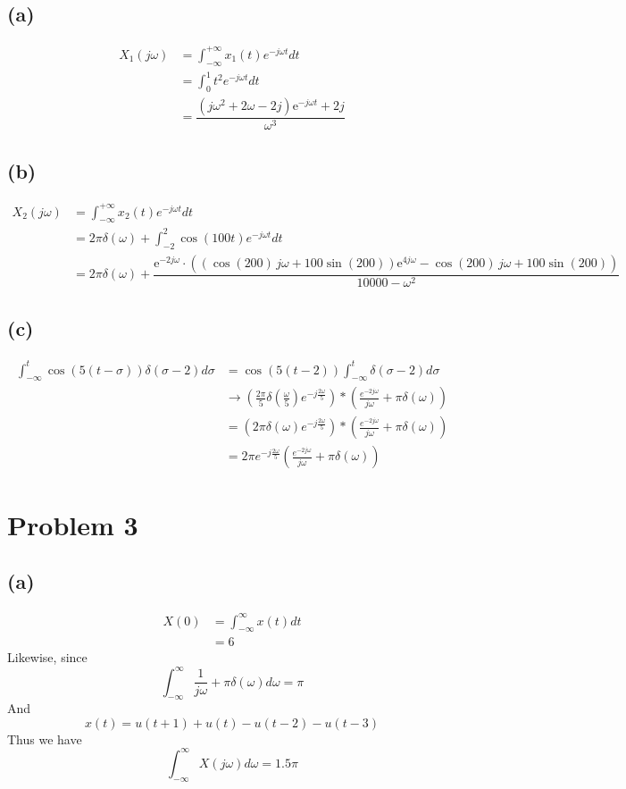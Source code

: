 \documentclass[12pt]{article}
\begin{document}
\subsection*{(a)}
\begin{align*}
X_1(j\omega)&=\int_{-\infty}^{+\infty} x_1(t)e^{-j\omega t}dt\\
&=\int_{0}^{1}t^2e^{-j\omega t}dt\\
&=\dfrac{\left(j{\omega}^2+2{\omega}-2j\right)\mathrm{e}^{-j{\omega}t}+2j}{{\omega}^3}
\end{align*}
\subsection*{(b)}
\begin{align*}
X_2(j\omega)&=\int_{-\infty}^{+\infty} x_2(t)e^{-j\omega t}dt\\
&=2\pi\delta(\omega)+\int_{-2}^{2}\cos(100t)e^{-j\omega t}dt\\
&=2\pi\delta(\omega)+\dfrac{\mathrm{e}^{-2j{\omega}}\cdot\left(\left(\cos\left(200\right)\,j{\omega}+100\sin\left(200\right)\right)\mathrm{e}^{4j{\omega}}-\cos\left(200\right)\,j{\omega}+100\sin\left(200\right)\right)}{10000-{\omega}^2}
\end{align*}
\subsection*{(c)}
\begin{align*}
\int_{-\infty}^t \cos(5(t-\sigma))\delta(\sigma-2)d\sigma &= \cos(5(t-2))\int_{-\infty}^t\delta(\sigma-2)d\sigma\\
&\to \left(\frac{2\pi}{5}\delta\left(\frac{\omega}{5}\right)e^{-j\frac{2\omega}{5}}\right)*\left(\frac{e^{-2j\omega}}{j\omega}+\pi \delta(\omega)\right)\\
&=\left(2\pi\delta(\omega)e^{-j\frac{2\omega}{5}}\right)*\left(\frac{e^{-2j\omega}}{j\omega}+\pi \delta(\omega)\right)\\
&=2\pi e^{-j\frac{2\omega}{5}}\left(\frac{e^{-2j\omega}}{j\omega}+\pi \delta(\omega)\right)
\end{align*}
\section*{Problem 3}
\subsection*{(a)}
\begin{align*}
X(0)&=\int_{-\infty}^{\infty}x(t)dt\\
&=6
\end{align*}
Likewise, since $$\int_{-\infty}^{\infty} \frac{1}{j\omega}+\pi\delta(\omega)d\omega=\pi$$
And 
$$x(t)=u(t+1)+u(t)-u(t-2)-u(t-3)$$
Thus we have
$$\int_{-\infty}^{\infty}X(j\omega)d\omega=1.5\pi$$
\end{document}
